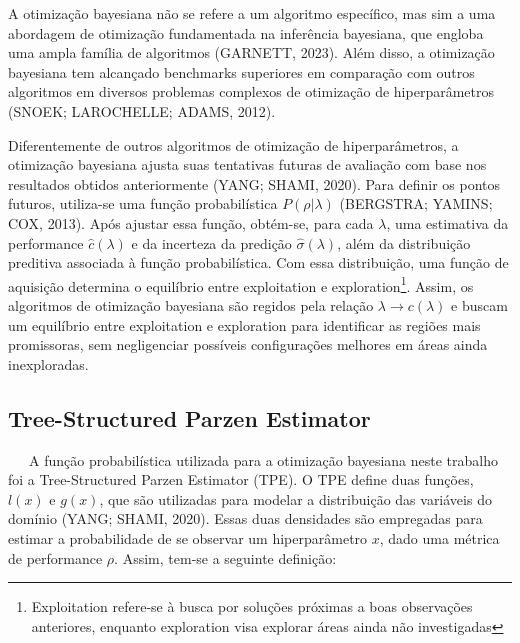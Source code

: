 \documentclass[
  12pt,
  a4paper,
]{scrreprt}
\begin{document}
\vspace{12pt}

A otimização bayesiana não se refere a um algoritmo específico, mas sim
a uma abordagem de otimização fundamentada na inferência bayesiana, que
engloba uma ampla família de algoritmos (GARNETT, 2023). Além disso, a
otimização bayesiana tem alcançado benchmarks superiores em comparação
com outros algoritmos em diversos problemas complexos de otimização de
hiperparâmetros (SNOEK; LAROCHELLE; ADAMS, 2012).

\vspace{12pt}

Diferentemente de outros algoritmos de otimização de hiperparâmetros, a
otimização bayesiana ajusta suas tentativas futuras de avaliação com
base nos resultados obtidos anteriormente (YANG; SHAMI, 2020). Para
definir os pontos futuros, utiliza-se uma função probabilística
\(P\left(\rho |  \lambda \right)\) (BERGSTRA; YAMINS; COX, 2013). Após
ajustar essa função, obtém-se, para cada \(\lambda\), uma estimativa da
performance \(\hat c \left(\lambda \right)\) e da incerteza da predição
\(\hat \sigma \left(\lambda \right)\), além da distribuição preditiva
associada à função probabilística. Com essa distribuição, uma função de
aquisição determina o equilíbrio entre exploitation e
exploration\footnote{Exploitation refere-se à busca por soluções
  próximas a boas observações anteriores, enquanto exploration visa
  explorar áreas ainda não investigadas}. Assim, os algoritmos de
otimização bayesiana são regidos pela relação
\(\lambda \to c\left(\lambda \right)\) e buscam um equilíbrio entre
exploitation e exploration para identificar as regiões mais promissoras,
sem negligenciar possíveis configurações melhores em áreas ainda
inexploradas.

\subsection{Tree-Structured Parzen
Estimator}\label{tree-structured-parzen-estimator}

~~~A função probabilística utilizada para a otimização bayesiana neste
trabalho foi a Tree-Structured Parzen Estimator (TPE). O TPE define duas
funções, \(l\left(x\right)\) e \(g\left(x\right)\), que são utilizadas
para modelar a distribuição das variáveis do domínio (YANG; SHAMI,
2020). Essas duas densidades são empregadas para estimar a probabilidade
de se observar um hiperparâmetro \(x\), dado uma métrica de performance
\(\rho\). Assim, tem-se a seguinte definição:
\end{document}
